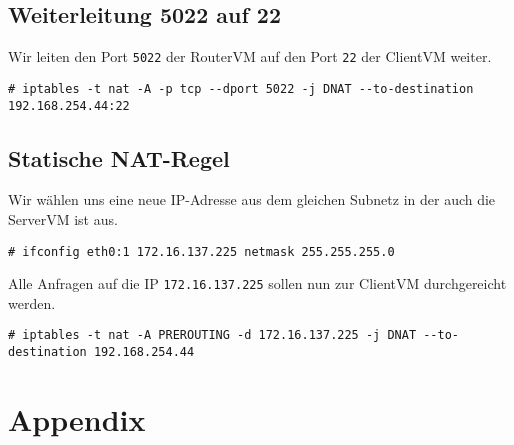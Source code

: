 \documentclass[10pt,a4paper]{article}
\begin{document}
\subsection{Weiterleitung 5022 auf 22} %

Wir leiten den Port \texttt{5022} der RouterVM auf den Port \texttt{22} der ClientVM weiter.
\begin{verbatim}
# iptables -t nat -A -p tcp --dport 5022 -j DNAT --to-destination 192.168.254.44:22 
\end{verbatim}

\subsection{Statische NAT-Regel} %

Wir wählen uns eine neue IP-Adresse aus dem gleichen Subnetz in der auch die ServerVM ist aus.
\begin{verbatim}
# ifconfig eth0:1 172.16.137.225 netmask 255.255.255.0
\end{verbatim}
Alle Anfragen auf die IP \texttt{172.16.137.225} sollen nun zur ClientVM durchgereicht werden.
\begin{verbatim}
# iptables -t nat -A PREROUTING -d 172.16.137.225 -j DNAT --to-destination 192.168.254.44
\end{verbatim}



\newpage
\section*{Appendix}
\end{document}
